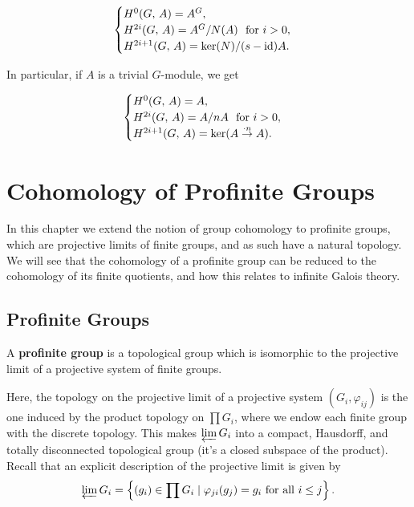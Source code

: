 \documentclass[a4paper, oneside]{memoir}
\begin{document}
\[
	\begin{cases}
		H^{0}( G, \, A )= A^G,                          \\
		H^{2i}( G, \, A ) = A^G/N(A) ~\text{ for } i>0, \\
		H^{2i+1}( G, \, A ) = \ker(N)/(s-\operatorname{id})A.
	\end{cases}
\]

In particular, if $A$ is a trivial $G$-module, we get

\begin{equation}\label{eq:CycCohomTriv}
	\begin{cases}
		H^{0}( G, \, A ) = A,                       \\
		H^{2i}( G, \, A ) = A/nA ~\text{ for } i>0, \\
		H^{2i+1}( G, \, A ) = \ker(A\overset{\cdot n}{\to} A).
	\end{cases}
\end{equation}

\chapter{Cohomology of Profinite Groups}

In this chapter we extend the notion of group cohomology to profinite groups, which are projective limits of finite groups, and as such have a natural topology. We will see that the cohomology of a profinite group can be reduced to the cohomology of its finite quotients, and how this relates to infinite Galois theory.

\section{Profinite Groups}
\begin{definition}
	A \textbf{profinite group} is a topological group which is isomorphic to the projective limit of a projective system of finite groups.
\end{definition}

Here, the topology on the projective limit of a projective system $(G_i,\varphi_{ij})$ is the one induced by the product topology on $\prod{G_i}$, where we endow each finite group with the discrete topology. This makes $\varprojlim{G_i}$ into a compact, Hausdorff, and totally disconnected topological group (it's a closed subspace of the product). Recall that an explicit description of the projective limit is given by
\[
	\varprojlim{G_i} = \left\{ (g_i) \in \prod{G_i} \mid \varphi_{ji}(g_j)=g_i \text{ for all } i\leq j \right\}.
\]
\end{document}
